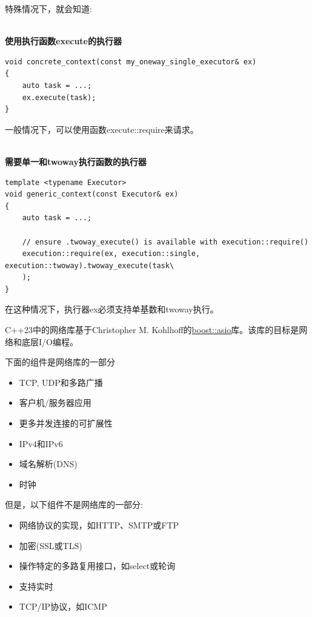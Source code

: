 特殊情况下，就会知道:

\hspace*{\fill} \\ %
\noindent
\textbf{使用执行函数execute的执行器}
\begin{lstlisting}[style=styleCXX]
void concrete_context(const my_oneway_single_executor& ex)
{
	auto task = ...;
	ex.execute(task);
}
\end{lstlisting}

一般情况下，可以使用函数execute::require来请求。

\hspace*{\fill} \\ %
\noindent
\textbf{需要单一和twoway执行函数的执行器}
\begin{lstlisting}[style=styleCXX]
template <typename Executor>
void generic_context(const Executor& ex)
{
	auto task = ...;
	
	// ensure .twoway_execute() is available with execution::require()
	execution::require(ex, execution::single, execution::twoway).twoway_execute(task\
	);
}
\end{lstlisting}

在这种情况下，执行器ex必须支持单基数和twoway执行。


C++23中的网络库基于Christopher M. Kohlhoff的\href{https://www.boost.org/doc/libs/1_75_0/doc/html/boost_asio.html}{boost::asio}库。该库的目标是网络和底层I/O编程。

下面的组件是网络库的一部分

\begin{itemize}
\item 
TCP, UDP和多路广播

\item 
客户机/服务器应用

\item 
更多并发连接的可扩展性

\item 
IPv4和IPv6

\item 
域名解析(DNS)

\item 
时钟
\end{itemize}

但是，以下组件不是网络库的一部分:

\begin{itemize}
\item 
网络协议的实现，如HTTP、SMTP或FTP

\item 
加密(SSL或TLS)

\item 
操作特定的多路复用接口，如select或轮询

\item 
支持实时

\item 
TCP/IP协议，如ICMP
\end{itemize}

